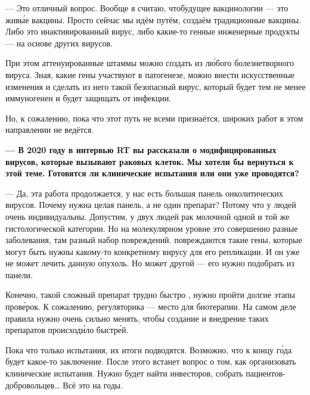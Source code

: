 --- Это отличный вопрос. Вообще я считаю, чтобудущее вакцинологии --- это жив\'{ы}е вакцины. Просто сейчас мы идём  путём, создаём традиционные вакцины. Либо это инактивированный вирус, либо какие-то генные инженерные продукты --- на основе других вирусов.

При этом аттенуированные штаммы можно создать из л\'{ю}бого болезнетворного вируса. Зная, какие гены участвуют в патогенезе, можно внести искусственные изменения и сделать из него такой безопасный вирус, который будет тем не менее иммуногенен и будет защищать от инфекции.

Но, к сожалению, пока что этот путь не всеми признаётся, широких работ в этом направлении не ведётся.

{\bf --- В 2020 году в интервью RT вы рассказали о  модифицированных вирусов, которые вызывают  раковых клеток. Мы хотели бы вернуться к этой теме. Готовятся ли клинические испытания или они уже проводятся?}

--- Да, эта работа продолжается, у нас есть большая панель онколитических вирусов. Почему нужна целая панель, а не один препарат? Потому что  у людей очень индивидуальны. Допустим, у двух людей рак молочной  одной и той же гистологической категории. Но на молекулярном уровне это совершенно разные заболевания, там разный набор повреждений.  повреждаются такие гены, которые могут быть нужны какому-то конкретному вирусу для его репликации. И он уже не может лечить данную \'{о}пухоль. Но может другой --- его нужно подобрать из панели.

Конечно, такой сложный препарат трудно быстро , нужно пройти долгие этапы пров\'{е}рок. К сожалению, регуляторика ---  место для биотерапии. На самом деле правила нужно очень сильно менять, чтобы создание и внедрение таких препаратов происход\'{и}ло быстр\'{е}й.

Пока что  только  испытания, их итоги подводятся. Возможно, что к концу г\'{о}да будет какое-то заключение. После этого встанет вопрос о том, как организовать клинические испытания. Нужно будет найти инвесторов, собрать пациентов-добровольцев\dots{} Всё это  на годы.

